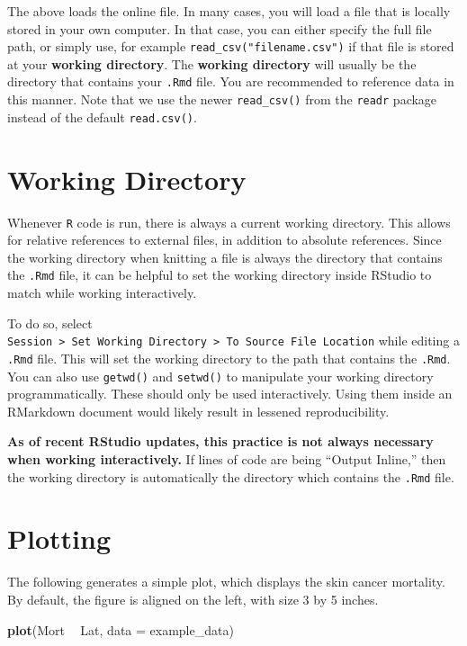 \documentclass[
]{book}
\newenvironment{Shaded}{\begin{snugshade}}{\end{snugshade}}
\newcommand{\DataTypeTok}[1]{\textcolor[rgb]{0.13,0.29,0.53}{#1}}
\newcommand{\KeywordTok}[1]{\textcolor[rgb]{0.13,0.29,0.53}{\textbf{#1}}}
\newcommand{\NormalTok}[1]{#1}
\newcommand{\OperatorTok}[1]{\textcolor[rgb]{0.81,0.36,0.00}{\textbf{#1}}}
\newcommand{\StringTok}[1]{\textcolor[rgb]{0.31,0.60,0.02}{#1}}
\begin{document}
The above loads the online file. In many cases, you will load a file that is locally stored in your own computer. In that case, you can either specify the full file path, or simply use, for example \texttt{read\_csv("filename.csv")} if that file is stored at your \textbf{working directory}. The \textbf{working directory} will usually be the directory that contains your \texttt{.Rmd} file. You are recommended to reference data in this manner. Note that we use the newer \texttt{read\_csv()} from the \texttt{readr} package instead of the default \texttt{read.csv()}.

\hypertarget{working-directory}{%
\section{Working Directory}\label{working-directory}}

Whenever \texttt{R} code is run, there is always a current working directory. This allows for relative references to external files, in addition to absolute references. Since the working directory when knitting a file is always the directory that contains the \texttt{.Rmd} file, it can be helpful to set the working directory inside RStudio to match while working interactively.

To do so, select \texttt{Session\ \textgreater{}\ Set\ Working\ Directory\ \textgreater{}\ To\ Source\ File\ Location} while editing a \texttt{.Rmd} file. This will set the working directory to the path that contains the \texttt{.Rmd}. You can also use \texttt{getwd()} and \texttt{setwd()} to manipulate your working directory programmatically. These should only be used interactively. Using them inside an RMarkdown document would likely result in lessened reproducibility.

\textbf{As of recent RStudio updates, this practice is not always necessary when working interactively.} If lines of code are being ``Output Inline,'' then the working directory is automatically the directory which contains the \texttt{.Rmd} file.

\hypertarget{plotting}{%
\section{Plotting}\label{plotting}}

The following generates a simple plot, which displays the skin cancer mortality. By default, the figure is aligned on the left, with size 3 by 5 inches.

\begin{Shaded}
\begin{Highlighting}[]
  \KeywordTok{plot}\NormalTok{(Mort }\OperatorTok{~}\StringTok{ }\NormalTok{Lat, }\DataTypeTok{data =}\NormalTok{ example_data)}
\end{Highlighting}
\end{Shaded}
\end{document}
